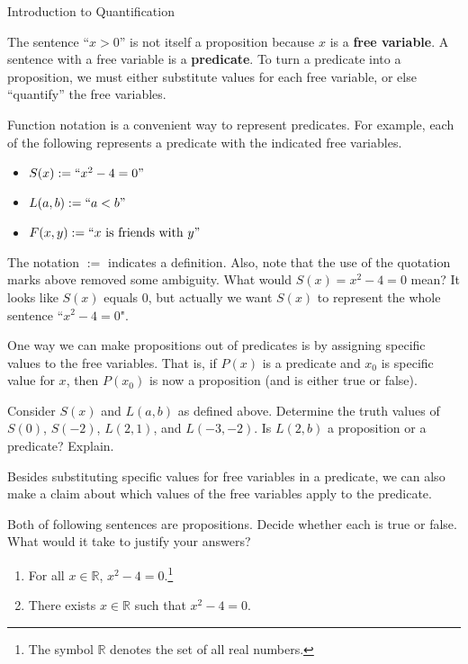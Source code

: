 \begin{section}{Introduction to Quantification}

The sentence ``$x>0$'' is not itself a proposition because $x$ is a \textbf{free variable}. A sentence with a free variable is a \textbf{predicate}. To turn a predicate into a proposition, we must either substitute values for each free variable, or else ``quantify'' the free variables.


Function notation is a convenient way to represent predicates. For example, each of the following represents a predicate with the indicated free variables.
\begin{itemize}
\item $S(x):=``x^2-4=0"$
\item $L(a,b):=``a<b"$
\item $F(x,y):=``x \mbox{ is friends with } y"$
\end{itemize}
The notation $:=$ indicates a definition.  Also, note that the use of the quotation marks above removed some ambiguity.  What would $S(x)=x^2-4=0$ mean?  It looks like $S(x)$ equals 0, but actually we want $S(x)$ to represent the whole sentence ``$x^2-4=0$". 

One way we can make propositions out of predicates is by assigning specific values to the free variables.  That is, if $P(x)$ is a predicate and $x_0$ is specific value for $x$, then $P(x_0)$ is now a proposition (and is either true or false).

\begin{exercise}
Consider $S(x)$ and $L(a,b)$ as defined above. Determine the truth values of $S(0)$, $S(-2)$, $L(2,1)$, and $L(-3,-2)$. Is $L(2,b)$ a proposition or a predicate?  Explain.
\end{exercise}

Besides substituting specific values for free variables in a predicate, we can also make a claim about which values of the free variables apply to the predicate.

\begin{exercise}\label{ex:quantified predicates}
Both of following sentences are propositions. Decide whether each is true or false. What would it take to justify your answers?
\begin{enumerate}[label=\textrm{(\alph*)}]
\item For all $x\in\mathbb{R}$, $x^2-4=0$.\footnote{The symbol $\mathbb{R}$ denotes the set of all real numbers.}
\item There exists $x\in\mathbb{R}$ such that $x^2-4=0$.
\end{enumerate}
\end{exercise}


\end{section}

